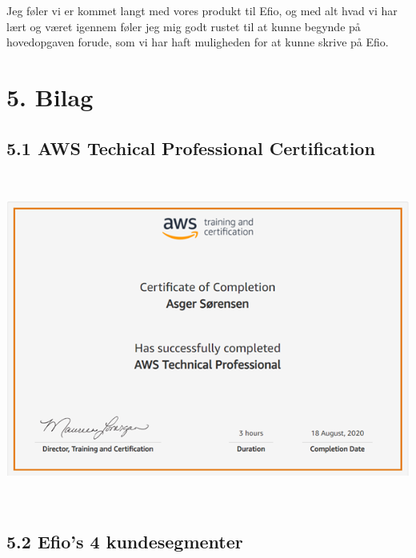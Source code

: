 \documentclass[11pt]{report}
\begin{document}
Jeg føler vi er kommet langt med vores produkt til Efio, og med alt hvad vi har lært og været igennem føler 
jeg mig godt rustet til at kunne begynde på hovedopgaven forude, som vi har haft muligheden for at kunne skrive på Efio.
 

\chapter*{5. Bilag}
\section*{5.1 AWS Techical Professional Certification}

\begin{center} 
\includegraphics[height=10.89cm, width=15.92cm]{aws-technical-professional}
\end{center}

\newpage

\section*{5.2 Efio's 4 kundesegmenter}
\end{document}
